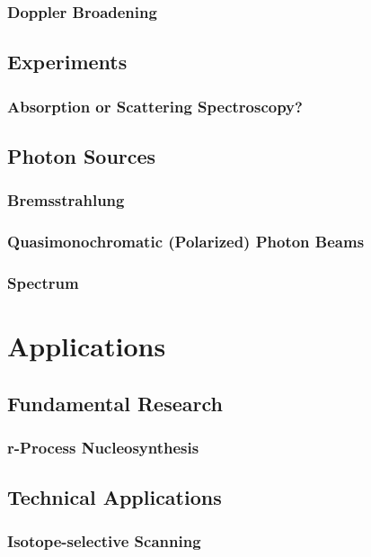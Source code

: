 \documentclass{beamer}
\begin{document}
\begin{frame}
    \frametitle{Doppler Broadening}
    
\end{frame}

\subsection{Experiments}

\begin{frame}
    \frametitle{Absorption or Scattering Spectroscopy?}
    
\end{frame}

\subsection{Photon Sources}

\begin{frame}
    \frametitle{Bremsstrahlung}
    
\end{frame}

\begin{frame}
    \frametitle{Quasimonochromatic (Polarized) Photon Beams}
    
\end{frame}

\begin{frame}
    \frametitle{Spectrum}
    
\end{frame}

\section{Applications}

\subsection{Fundamental Research}

\begin{frame}
    \frametitle{r-Process Nucleosynthesis}
      
\end{frame}

\subsection{Technical Applications}

\begin{frame}
    \frametitle{Isotope-selective Scanning}
    
\end{frame}
\end{document}
